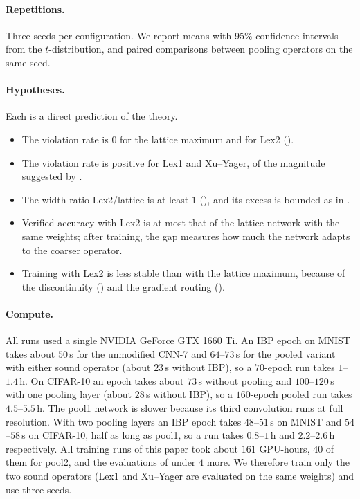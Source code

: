 \paragraph{Repetitions.} Three seeds per configuration. We report means with 95\% confidence intervals from the $t$-distribution, and paired comparisons between pooling operators on the same seed.

\paragraph{Hypotheses.} Each is a direct prediction of the theory.
\begin{itemize}
\item[\textbf{H1}] The violation rate is $0$ for the lattice maximum and for Lex2 ().
\item[\textbf{H2}] The violation rate is positive for Lex1 and Xu--Yager, of the magnitude suggested by .
\item[\textbf{H3}] The width ratio Lex2/lattice is at least $1$ (), and its excess is bounded as in .
\item[\textbf{H4}] Verified accuracy with Lex2 is at most that of the lattice network with the same weights; after training, the gap measures how much the network adapts to the coarser operator.
\item[\textbf{H5}] Training with Lex2 is less stable than with the lattice maximum, because of the discontinuity () and the gradient routing ().
\end{itemize}

\paragraph{Compute.} All runs used a single NVIDIA GeForce GTX 1660 Ti. An IBP epoch on MNIST takes about $50$\,s for the unmodified CNN-7 and $64$--$73$\,s for the pooled variant with either sound operator (about $23$\,s without IBP), so a $70$-epoch run takes $1$--$1.4$\,h. On CIFAR-10 an epoch takes about $73$\,s without pooling and $100$--$120$\,s with one pooling layer (about $28$\,s without IBP), so a $160$-epoch pooled run takes $4.5$--$5.5$\,h. The pool1 network is slower because its third convolution runs at full resolution. With two pooling layers an IBP epoch takes $48$--$51$\,s on MNIST and $54$--$58$\,s on CIFAR-10, half as long as pool1, so a run takes $0.8$--$1$\,h and $2.2$--$2.6$\,h respectively. All training runs of this paper took about $161$ GPU-hours, $40$ of them for pool2, and the evaluations of  under $4$ more. We therefore train only the two sound operators (Lex1 and Xu--Yager are evaluated on the same weights) and use three seeds.


